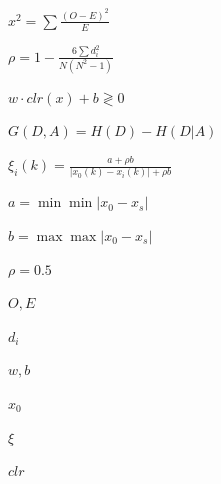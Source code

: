 
$x^2=\sum\frac{(O-E)^2}{E}$

$\rho=1-\frac{6\sum d_i^2}{N(N^2-1)}$

$w\cdot clr(x)+b \gtrless 0$

$G(D,A)=H(D)-H(D|A)$

$\xi_i(k)=\frac{a+\rho b}{|x_0(k)-x_i(k)|+\rho b}$

$a=\min\min|x_0-x_s|$

$b=\max\max|x_0-x_s|$

$\rho=0.5$

$O,E$

$d_i$

$w,b$

$x_0$

$\xi$

$clr$
